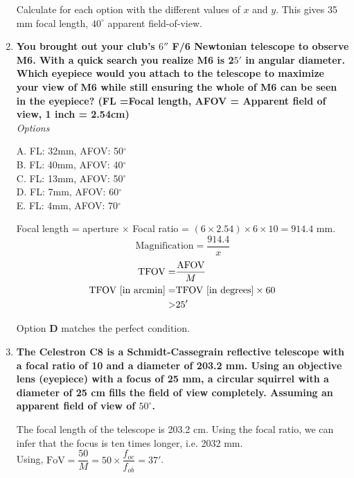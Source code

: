 \documentclass[a4paper,12pt]{extarticle}
\begin{document}
\begin{enumerate}
\begin{sol}
Calculate for each option with the different values of $x$ and $y$. This gives 35 mm focal length, $40^\circ$ apparent field-of-view.
\end{sol}
\item \textbf{You brought out your club’s $6''$ F/6 Newtonian telescope to observe M6. With a quick search you realize M6 is 2$5'$ in angular diameter. Which eyepiece would you attach to the telescope to maximize your view of M6 while still ensuring the whole of M6 can be seen in the eyepiece? (FL =Focal length, AFOV = Apparent field of view, 1 inch = 2.54cm)}	\\

\textit{Options}
\begin{multicols}{2}
A. FL: 32mm, AFOV: 50$^\circ$\\
B. FL: 40mm, AFOV: 40$^\circ$\\
C. FL: 13mm, AFOV: 50$^\circ$\\
D. FL: 7mm, AFOV: 60$^\circ$\\
E. FL: 4mm, AFOV: 70$^\circ$
\end{multicols}


\begin{sol}
Focal length = aperture $\times$ Focal ratio = $(6\times 2.54) \times 6 \times 10  = 914.4$ mm.
\[\text{Magnification} =\frac{914.4}{x}\]
\begin{align*}
	\text{TFOV}=&\frac{\rm AFOV}{M}\\
	\text{TFOV [in arcmin]}=&\text{TFOV [in degrees]} \times 60\\
	>& 25'
\end{align*}

Option \textbf{D} matches the perfect condition.	
\end{sol}



\item \textbf{The Celestron C8 is a Schmidt-Cassegrain reflective telescope with a focal ratio of 10 and a diameter of 203.2 mm. Using an objective lens (eyepiece) with a focus of 25 mm, a circular squirrel with a diameter of 25 cm fills the field of view completely. Assuming an apparent field of view of $50^\circ$.}
\begin{sol}
The focal length of the telescope is 203.2 cm. Using the focal ratio, we can infer that the focus is ten times longer, i.e.
2032 mm.\\

Using, $\text{FoV} =\dfrac{50}{M}=50\times \dfrac{f_{oc}}{f_{ob}}=37'$.\\


\end{sol}
\end{enumerate}
\end{document}

